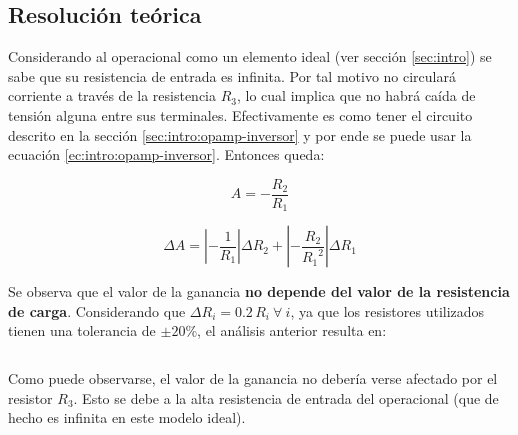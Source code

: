 \subsection{Resolución teórica}

Considerando al operacional como un elemento ideal (ver sección \ref{sec:intro})
se sabe que su resistencia de entrada es infinita. Por tal motivo no circulará
corriente a través de la resistencia $R_3$, lo cual implica que no habrá caída
de tensión alguna entre sus terminales. Efectivamente es como tener el circuito
descrito en la sección \ref{sec:intro:opamp-inversor} y por ende se puede usar
la ecuación \ref{ec:intro:opamp-inversor}. Entonces queda:

\begin{equation}
    \label{ec:1-teoria:ganancia}
    A = -\frac{R_2}{R_1}
\end{equation}

\begin{equation}
    \label{ec:1-teoria:err-ganancia}
    \Delta A = \left| - \frac{1}{R_1} \right| \Delta R_2
             + \left| - \frac{R_2}{{R_1}^2} \right| \Delta R_1
\end{equation}

Se observa que el valor de la ganancia \textbf{no depende del valor de la
resistencia de carga}. Considerando que $\Delta R_i = 0.2\,R_i\ \forall\ i$, ya
que los resistores utilizados tienen una tolerancia de $\pm 20\%$, el análisis
anterior resulta en:

\[
    
\]

Como puede observarse, el valor de la ganancia no debería verse afectado por el
resistor $R_3$. Esto se debe a la alta resistencia de entrada del operacional
(que de hecho es infinita en este modelo ideal).
